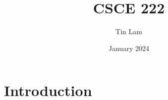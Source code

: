 \documentclass{article}
\title{CSCE 222}
\author{Tin Lam}
\date{January 2024}
\begin{document}
\maketitle

\section{Introduction}
\end{document}
